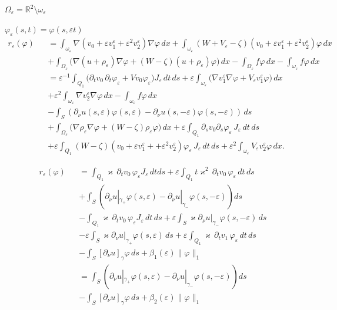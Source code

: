 \documentclass[graybox]{svmult}
\renewcommand{\kappa}{\varkappa}
\newcommand{\Real}{\mathbb R}
\newcommand{\eps}{\varepsilon}
\renewcommand{\phi}{\varphi}
\begin{document}
$\Omega_\eps=\Real^2\setminus\omega_\eps$

$\phi_\eps(s,t)=\phi(s,\eps t)$
\begin{eqnarray}\nonumber
r_\eps(\phi)&&=
\int_{\omega_\eps}\nabla(v_0+\eps v_1^\eps+\eps^2 v_2^\eps)\nabla \phi\,dx
        +\int_{\omega_\eps}(W+V_\eps-\zeta)(v_0+\eps v_1^\eps+\eps^2 v_2^\eps) \phi\,dx
\\\nonumber
      &&+
\int_{\Omega_\eps}\big(\nabla(u+\rho_\eps)\nabla \phi
            + (W-\zeta)(u+\rho_\eps) \phi\big)\,dx
            -\int_{\Omega_\eps}f\phi\,dx-\int_{\omega_\eps}f\phi\,dx
\\\nonumber
&&=\eps^{-1}\int_{Q_1}\big(\partial_t v_0 \,\partial_t \phi_\eps
+Vv_0 \phi_\eps\big)J_\eps\,dt\, ds
+\eps\int_{\omega_\eps}\big(\nabla v_1^\eps\nabla \phi+V_\eps v_1^\eps\phi\big)\,dx
\\\nonumber
&&+\eps^2\int_{\omega_\eps}\nabla v_2^\eps\nabla \phi\,dx-\int_{\omega_\eps}f\phi\,dx
\\\nonumber
&&-\int_S (\partial_\nu u(s,\eps)\phi(s,\eps)-\partial_\nu u(s,-\eps)\phi(s,-\eps) )\,ds
\\\nonumber
&&
+\int_{\Omega_\eps}\big(\nabla\rho_\eps\nabla \phi
+(W-\zeta)\rho_\eps \phi\big)\,dx+\eps\int_{Q_1}\partial_s v_0 \partial_s \phi_\eps\,J_\eps\,dt\, ds
\\\nonumber
&&
+\eps \int_{Q_1}(W-\zeta)(v_0+\eps v_1^\eps++\eps^2 v_2^\eps)\phi_\eps\,J_\eps\,dt\, ds+\eps^2\int_{\omega_\eps}V_\eps v_2^\eps\phi\,dx.
\end{eqnarray}



\begin{eqnarray}\nonumber
r_\eps(\phi)&&= \int_{Q_1} \kappa\,\partial_t v_0\, \phi_\eps J_\eps\,dt ds+\eps\int_{Q_1} t\kappa^2\,\partial_t v_0 \,\phi_\eps \,dt \,ds
\\\nonumber
      &&
+\int_S\left(\partial_\nu u|_{\gamma_+}\phi(s,\eps)-\partial_\nu u|_{\gamma_-}\phi(s,-\eps)\right)ds\\\nonumber
&&-
\int_{Q_1}\kappa \,\partial_t v_0\, \phi_\eps J_\eps\,dt\, ds+\eps \int_S \kappa\partial_\nu u|_{\gamma_-}\phi(s,-\eps)\,ds
\\\nonumber
&&-
\eps \int_S \kappa\partial_\nu u|_{\gamma_+}\phi(s,\eps)\,ds
+\eps\int_{Q_1}\kappa \,\partial_t v_1\, \phi_\eps\,dt\, ds
\\\nonumber
      &&
-\int_S [\partial_\nu u]_{\gamma} \phi\,ds+\beta_1(\eps)\|\phi\|_1
\\\nonumber
&&
=\int_S\left(\partial_\nu u|_{\gamma_+}\phi(s,\eps)-\partial_\nu u|_{\gamma_-}\phi(s,-\eps)\right)ds
\\\nonumber
&&
-\int_S [\partial_\nu u]_{\gamma} \phi\,ds+\beta_2(\eps)\|\phi\|_1
\end{eqnarray}
\end{document}
